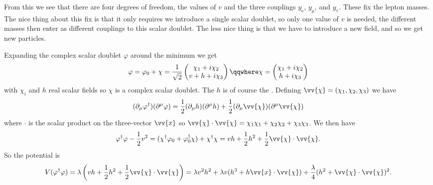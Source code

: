 \documentclass[fleqn]{NotesClass}
\newcommand{\Pparticle}[1]{\mathrm{#1}}
\newcommand{\Pex}{\ensuremath{\Pparticle{e}}}
\newcommand{\Pmux}{\ensuremath{\upmu}}
\newcommand{\Ptaux}{\ensuremath{\uptau}}
\newcommand{\hermit}{\dagger}
\begin{document}
    From this we see that there are four degrees of freedom, the values of \(v\) and the three couplings \(y_{\Pex}\), \(y_{\Pmux}\), and \(y_{\Ptaux}\).
    These fix the lepton masses.
    The nice thing about this fix is that it only requires we introduce a single scalar doublet, so only one value of \(v\) is needed, the different masses then enter as different couplings to this scalar doublet.
    The less nice thing is that we have to introduce a new field, and so we get new particles.
    
    Expanding the complex scalar doublet \(\varphi\) around the minimum we get
    \begin{equation}
        \varphi = \varphi_0 + \chi = \frac{1}{\sqrt{2}}
        \begin{pmatrix}
            \chi_1 + i\chi_2\\
            v + h + i\chi_3
        \end{pmatrix}
        \qqwhere \chi = 
        \begin{pmatrix}
            \chi_1 + i\chi_2\\
            h + i\chi_3
        \end{pmatrix}
    \end{equation}
    with \(\chi_i\) and \(h\) real scalar fields so \(\chi\) is a complex scalar doublet.
    The \(h\) is of course the .
    Defining \(\vv{\chi} = (\chi_1, \chi_2, \chi_3)\) we have
    \begin{equation}
        (\partial_\mu \varphi^\hermit)(\partial^\mu \varphi) = \frac{1}{2}(\partial_\mu h)(\partial^\mu h) + \frac{1}{2}(\partial_\mu \vv{\chi})(\partial^\mu \vv{\chi})
    \end{equation}
    where \(\cdot\) is the scalar product on the three-vector \(\vv{x}\) so \(\vv{\chi} \cdot \vv{\chi} = \chi_1\chi_1 + \chi_2\chi_2 + \chi_3\chi_3\).
    We then have
    \begin{equation}
        \varphi^\hermit \varphi - \frac{1}{2}v^2 = (\chi^\hermit \varphi_0 + \varphi_0^\hermit \chi) + \chi^\hermit \chi = vh + \frac{1}{2}h^2 + \frac{1}{2}\vv{\chi} \cdot \vv{\chi}.
    \end{equation}
    So the potential is
    \begin{equation}
        V(\varphi^\hermit \varphi) = \lambda\left( vh + \frac{1}{2}h^2 + \frac{1}{2}\vv{\chi} \cdot \vv{\chi} \right) = \lambda v^2 h^2 + \lambda v(h^3 + h\vv{x}\cdot \vv{\chi}) + \frac{\lambda}{4}(h^2 + \vv{\chi} \cdot \vv{\chi})^2. \notag
    \end{equation}
\end{document}
